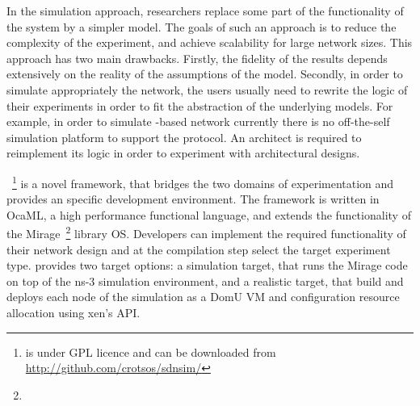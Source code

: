 In the simulation approach, researchers replace some part of the functionality
of the system by a simpler model. The goals of such an approach is to reduce the
complexity of the experiment, and achieve scalability for large network sizes. This
approach has two main drawbacks. Firstly, the fidelity of the results depends
extensively on the reality of the assumptions of the model. Secondly, in order to
simulate appropriately the network, the users usually need to rewrite the logic
of their experiments in order to fit the abstraction of the underlying models.
For example, in order to simulate \of-based network currently there is no
off-the-self simulation platform to support the protocol. An \of architect is
required to reimplement its \of logic in order to experiment with architectural
designs. 

\sdnsim~\footnote{\oflops is under GPL licence and can be downloaded from
  \url{http://github.com/crotsos/sdnsim/}} is a novel framework, that bridges
the two domains of experimentation and provides an \of specific development
environment. The framework is written in OcaML, a high performance functional
language, and extends the functionality of the
Mirage~\footnote{\mirageurl} library OS. Developers can
  implement the required functionality of their network design and at the
  compilation step select the target experiment type. \sdnsim provides two
  target options: a simulation target, that runs the Mirage code
  on top of the ns-3 simulation environment, and a realistic target, that build
  and deploys each node of the simulation as a DomU VM and configuration
  resource allocation using xen's API. 

% 

